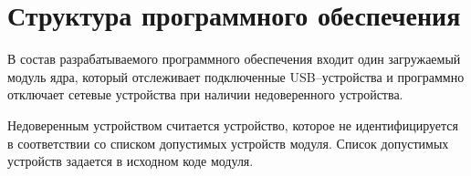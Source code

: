 
\section{Структура программного обеспечения}

В состав разрабатываемого программного обеспечения входит один загружаемый модуль ядра, который отслеживает подключенные USB--устройства и программно отключает сетевые устройства при наличии недоверенного устройства. 

Недоверенным устройством считается устройство, которое не идентифицируется в соответствии со списком допустимых устройств модуля. Список допустимых устройств задается в исходном коде модуля.
